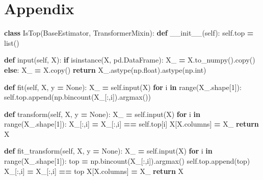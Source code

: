 \documentclass[
]{article}
\newenvironment{Shaded}{\begin{snugshade}}{\end{snugshade}}
\newcommand{\BuiltInTok}[1]{#1}
\newcommand{\ControlFlowTok}[1]{\textcolor[rgb]{0.13,0.29,0.53}{\textbf{#1}}}
\newcommand{\DecValTok}[1]{\textcolor[rgb]{0.00,0.00,0.81}{#1}}
\newcommand{\FunctionTok}[1]{\textcolor[rgb]{0.00,0.00,0.00}{#1}}
\newcommand{\KeywordTok}[1]{\textcolor[rgb]{0.13,0.29,0.53}{\textbf{#1}}}
\newcommand{\NormalTok}[1]{#1}
\newcommand{\OperatorTok}[1]{\textcolor[rgb]{0.81,0.36,0.00}{\textbf{#1}}}
\newcommand{\VariableTok}[1]{\textcolor[rgb]{0.00,0.00,0.00}{#1}}
\begin{document}
\newpage

\hypertarget{appendix}{%
\section{Appendix}\label{appendix}}

\begin{Shaded}
\begin{Highlighting}[]
\KeywordTok{class}\NormalTok{ IsTop(BaseEstimator, TransformerMixin):}
    \KeywordTok{def} \FunctionTok{\_\_init\_\_}\NormalTok{(}\VariableTok{self}\NormalTok{):}
        \VariableTok{self}\NormalTok{.top }\OperatorTok{=} \BuiltInTok{list}\NormalTok{()}
        
    \KeywordTok{def} \BuiltInTok{input}\NormalTok{(}\VariableTok{self}\NormalTok{, X):}
        \ControlFlowTok{if} \BuiltInTok{isinstance}\NormalTok{(X, pd.DataFrame):}
\NormalTok{            X\_ }\OperatorTok{=}\NormalTok{ X.to\_numpy().copy()}
        \ControlFlowTok{else}\NormalTok{: X\_ }\OperatorTok{=}\NormalTok{ X.copy()}
        \ControlFlowTok{return}\NormalTok{ X\_.astype(np.}\BuiltInTok{float}\NormalTok{).astype(np.}\BuiltInTok{int}\NormalTok{)}
    
    \KeywordTok{def}\NormalTok{ fit(}\VariableTok{self}\NormalTok{, X, y }\OperatorTok{=} \VariableTok{None}\NormalTok{):}
\NormalTok{        X\_ }\OperatorTok{=} \VariableTok{self}\NormalTok{.}\BuiltInTok{input}\NormalTok{(X)}
        \ControlFlowTok{for}\NormalTok{ i }\KeywordTok{in} \BuiltInTok{range}\NormalTok{(X\_.shape[}\DecValTok{1}\NormalTok{]):}
            \VariableTok{self}\NormalTok{.top.append(np.bincount(X\_[:,i]).argmax())}
            
    \KeywordTok{def}\NormalTok{ transform(}\VariableTok{self}\NormalTok{, X, y }\OperatorTok{=} \VariableTok{None}\NormalTok{):}
\NormalTok{        X\_ }\OperatorTok{=} \VariableTok{self}\NormalTok{.}\BuiltInTok{input}\NormalTok{(X)}
        \ControlFlowTok{for}\NormalTok{ i }\KeywordTok{in} \BuiltInTok{range}\NormalTok{(X\_.shape[}\DecValTok{1}\NormalTok{]):}
\NormalTok{            X\_[:,i] }\OperatorTok{=}\NormalTok{ X\_[:,i] }\OperatorTok{==} \VariableTok{self}\NormalTok{.top[i]}
\NormalTok{        X[X.columns] }\OperatorTok{=}\NormalTok{ X\_}
        \ControlFlowTok{return}\NormalTok{ X}
    
    \KeywordTok{def}\NormalTok{ fit\_transform(}\VariableTok{self}\NormalTok{, X, y }\OperatorTok{=} \VariableTok{None}\NormalTok{):}
\NormalTok{        X\_ }\OperatorTok{=} \VariableTok{self}\NormalTok{.}\BuiltInTok{input}\NormalTok{(X)}
        \ControlFlowTok{for}\NormalTok{ i }\KeywordTok{in} \BuiltInTok{range}\NormalTok{(X\_.shape[}\DecValTok{1}\NormalTok{]):}
\NormalTok{            top }\OperatorTok{=}\NormalTok{ np.bincount(X\_[:,i]).argmax()}
            \VariableTok{self}\NormalTok{.top.append(top)}
\NormalTok{            X\_[:,i] }\OperatorTok{=}\NormalTok{ X\_[:,i] }\OperatorTok{==}\NormalTok{ top}
\NormalTok{        X[X.columns] }\OperatorTok{=}\NormalTok{ X\_}
        \ControlFlowTok{return}\NormalTok{ X}
\end{Highlighting}
\end{Shaded}
\end{document}
